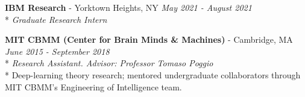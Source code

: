 \documentclass{article}
\newenvironment{changemargin}[2]{%
  \begin{list}{}{%
    \setlength{\topsep}{0pt}%
    \setlength{\leftmargin}{#1}%
    \setlength{\rightmargin}{#2}%
    \setlength{\listparindent}{\parindent}%
    \setlength{\itemindent}{\parindent}%
    \setlength{\parsep}{\parskip}%
  }%
  \item[]}{\end{list}
}
\newenvironment{body} {
		\vspace*{-16pt}
		\begin{changemargin}{-0.25in}{-0.5in}
	  }
		{\end{changemargin}\vspace{8pt plus 12pt}
	}
\begin{document}
\begin{body}
	\textbf{IBM Research} - Yorktown Heights, NY \hfill \emph{May 2021 - August 2021}\\*
	\emph{Graduate Research Intern}\\
	\vspace{8pt}

	\textbf{MIT CBMM (Center for Brain Minds \& Machines)} - Cambridge, MA \hfill \emph{June 2015 - September 2018}\\*
	\emph{Research Assistant. Advisor: Professor Tomaso Poggio}\\*
	Deep-learning theory research; mentored undergraduate collaborators through MIT CBMM's Engineering of Intelligence team.\\

\end{body}

\end{document}
